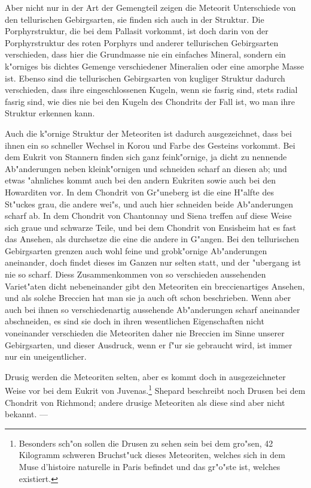 \documentclass[a4paper, 11pt, oneside]{article}
\begin{document}
Aber nicht nur in der Art der Gemengteil zeigen die Meteorit Unterschiede von den tellurischen Gebirgsarten, sie finden sich auch in der Struktur. Die Porphyrstruktur, die bei dem Pallasit vorkommt, ist doch darin von der Porphyrstruktur des roten Porphyrs und anderer tellurischen Gebirgsarten verschieden, dass hier die Grundmasse nie ein einfaches Mineral, sondern ein k"orniges bis dichtes Gemenge verschiedener Mineralien oder eine amorphe Masse ist. Ebenso sind die tellurischen Gebirgsarten von kugliger Struktur dadurch verschieden, dass ihre eingeschlossenen Kugeln, wenn sie fasrig sind, stets radial fasrig sind, wie dies nie bei den Kugeln des Chondrits der Fall ist, wo man ihre Struktur erkennen kann.

Auch die k"ornige Struktur der Meteoriten ist dadurch ausgezeichnet, dass bei ihnen ein so schneller Wechsel in Korou und Farbe des Gesteins vorkommt. Bei dem Eukrit von Stannern finden sich ganz feink"ornige, ja dicht zu nennende Ab"anderungen neben kleink"ornigen und schneiden scharf an diesen ab; und etwas "ahnliches kommt auch bei den andern Eukriten sowie auch bei den Howarditen vor. In dem Chondrit von Gr"uneberg ist die eine H"alfte des St"uckes grau, die andere wei"s, und auch hier schneiden beide Ab"anderungen scharf ab. In dem Chondrit von Chantonnay und Siena treffen auf diese Weise sich graue und schwarze Teile, und bei dem Chondrit von Ensisheim hat es fast das Ansehen, als durchsetze die eine die andere in G"angen. Bei den tellurischen Gebirgsarten grenzen auch wohl feine und grobk"ornige Ab"anderungen aneinander, doch findet dieses im Ganzen nur selten statt, und der "ubergang ist nie so scharf. Diess Zusammenkommen von so verschieden aussehenden Variet"aten dicht nebeneinander gibt den Meteoriten ein breccienartiges Ansehen, und als solche Breccien hat man sie ja auch oft schon beschrieben. Wenn aber auch bei ihnen so verschiedenartig aussehende Ab"anderungen scharf aneinander abschneiden, es sind sie doch in ihren wesentlichen Eigenschaften nicht voneinander verschieden die Meteoriten daher nie Breccien im Sinne unserer Gebirgsarten, und dieser Ausdruck, wenn er f"ur sie gebraucht wird, ist immer nur ein uneigentlicher.

Drusig werden die Meteoriten selten, aber es kommt doch in ausgezeichneter Weise vor bei dem Eukrit von Juvenas.\footnote{Besonders sch"on sollen die Drusen zu sehen sein bei dem gro"sen, 42 Kilogramm schweren Bruchst"uck dieses Meteoriten, welches sich in dem Muse d'histoire naturelle in Paris befindet und das gr"o"ste ist, welches existiert.} Shepard beschreibt noch Drusen bei dem Chondrit von Richmond; andere drusige Meteoriten als diese sind aber nicht bekannt. ---
\end{document}
